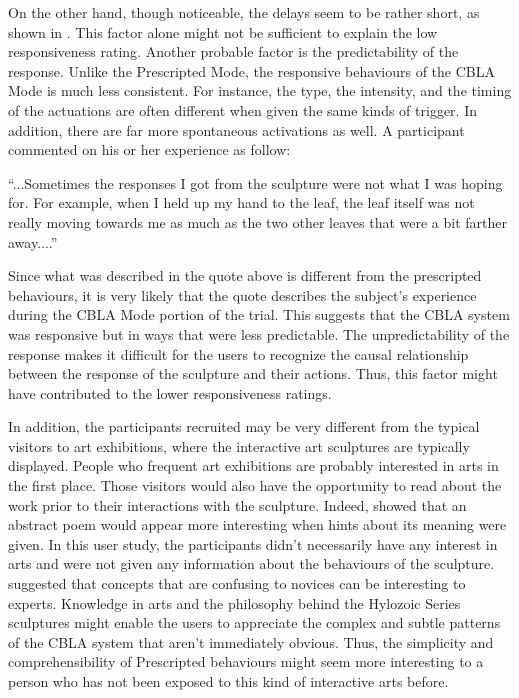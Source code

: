 On the other hand, though noticeable, the delays seem to be rather short, as shown in . This factor alone might not be sufficient to explain the low responsiveness rating. Another probable factor is the predictability of the response. Unlike the Prescripted Mode, the responsive behaviours of the CBLA Mode is much less consistent. For instance, the type, the intensity, and the timing of the actuations are often different when given the same kinds of trigger. In addition, there are far more spontaneous activations as well. A participant commented on his or her experience as follow: 
\begin{blockquote}
	``...Sometimes the responses I got from the sculpture were not what I was hoping for. For example, when I held up my hand to the leaf, the leaf itself was not really moving towards me as much as the two other leaves that were a bit farther away....''
\end{blockquote}
Since what was described in the quote above is different from the prescripted behaviours, it is very likely that the quote describes the subject's experience during the CBLA Mode portion of the trial. This suggests that the CBLA system was responsive but in ways that were less predictable. 
The unpredictability of the response makes it difficult for the users to recognize the causal relationship between the response of the sculpture and their actions. Thus, this factor might have contributed to the lower responsiveness ratings.
	 
In addition, the participants recruited may be very different from the typical visitors to art exhibitions, where the interactive art sculptures are typically displayed. People who frequent art exhibitions are probably interested in arts in the first place. Those visitors would also have the opportunity to read about the work prior to their interactions with the sculpture. Indeed, \cite{Silvia2005} showed that an abstract poem would appear more interesting when hints about its meaning were given. In this user study, the participants didn't necessarily have any interest in arts and were not given any information about the behaviours of the sculpture. \cite{Silvia2008} suggested that concepts that are confusing to novices can be interesting to experts. Knowledge in arts and the philosophy behind the Hylozoic Series sculptures might enable the users to appreciate the complex and subtle patterns of the CBLA system that aren't immediately obvious. Thus, the simplicity and comprehensibility of Prescripted behaviours might seem more interesting to a person who has not been exposed to this kind of interactive arts before. 

